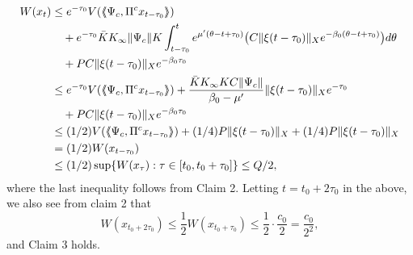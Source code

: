 \documentclass[12pt]{amsart}
\begin{document}
\begin{align*}
   W(x_t) 
   &\leq e^{-\tau_0}V({\langle\hspace{-1mm}\langle}\Psi_c, \Pi^c x_{t-\tau_0} {\rangle\hspace{-1mm}\rangle})   \\
   &\quad +e^{-\tau_0} \bar K K_\infty \|\Psi_c\|
          K\int_{t-\tau_0}^t e^{\mu'(\theta-t+\tau_0)} \big(C\|\xi(t-\tau_0)\|_X          e^{-\beta_0(\theta-t+\tau_0)}\big) d\theta \\
   &\quad +PC\|\xi(t-\tau_0)\|_Xe^{-\beta_0 \tau_0}   \\
   &\leq e^{-\tau_0}V({\langle\hspace{-1mm}\langle}\Psi_c, \Pi^c x_{t-\tau_0} {\rangle\hspace{-1mm}\rangle}) 
         +\frac{\bar K K_\infty KC\|\Psi_c\|}{\beta_0-\mu'}
         \|\xi(t-\tau_0)\|_X e^{-\tau_0} \\ 
  &\quad +PC\|\xi(t-\tau_0)\|_Xe^{-\beta_0 \tau_0}  \\
  &\leq (1/2) V({\langle\hspace{-1mm}\langle}\Psi_c, \Pi^c x_{t-\tau_0} {\rangle\hspace{-1mm}\rangle})
        + (1/4)P\|\xi(t-\tau_0)\|_X+ (1/4)P\|\xi(t-\tau_0)\|_X \\
  &= (1/2)W(x_{t-\tau_0})  \\
  &\leq (1/2)\sup \{W(x_\tau): \tau\in [t_0,t_0+\tau_0]\}
   \leq Q/2,
\end{align*}
where the last inequality follows from Claim 2. Letting $t=t_0+2\tau_0$ 
in the above, we also see from claim 2 that
$$
   W(x_{t_0+2\tau_0})
   \leq \frac{1}{2}W(x_{t_0+\tau_0})
   \leq \frac{1}{2}\cdot \frac{c_0}{2}
   = \frac{c_0}{2^2},
$$
and Claim 3 holds.

\vskip 2.5mm
\end{document}
